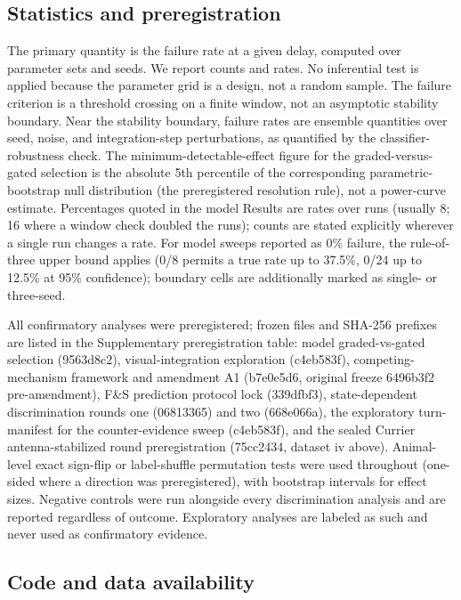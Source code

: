 \documentclass[pdflatex,sn-nature]{sn-jnl}
\begin{document}
\subsection{Statistics and preregistration}

The primary quantity is the failure rate at a given delay, computed over parameter sets and seeds. We report counts and rates. No inferential test is applied because the parameter grid is a design, not a random sample. The failure criterion is a threshold crossing on a finite window, not an asymptotic stability boundary. Near the stability boundary, failure rates are ensemble quantities over seed, noise, and integration-step perturbations, as quantified by the classifier-robustness check. The minimum-detectable-effect figure for the graded-versus-gated selection is the absolute 5th percentile of the corresponding parametric-bootstrap null distribution (the preregistered resolution rule), not a power-curve estimate. Percentages quoted in the model Results are rates over runs (usually 8; 16 where a window check doubled the runs); counts are stated explicitly wherever a single run changes a rate. For model sweeps reported as 0\% failure, the rule-of-three upper bound applies (0/8 permits a true rate up to 37.5\%, 0/24 up to 12.5\% at 95\% confidence); boundary cells are additionally marked as single- or three-seed.

All confirmatory analyses were preregistered; frozen files and SHA-256 prefixes are listed in the Supplementary preregistration table: model graded-vs-gated selection (9563d8c2), visual-integration exploration (c4eb583f), competing-mechanism framework and amendment A1 (b7e0e5d6, original freeze 6496b3f2 pre-amendment), F\&S prediction protocol lock (339dfbf3), state-dependent discrimination rounds one (06813365) and two (668e066a), the exploratory turn-manifest for the counter-evidence sweep (c4eb583f), and the sealed Currier antenna-stabilized round preregistration (75cc2434, dataset iv above). Animal-level exact sign-flip or label-shuffle permutation tests were used throughout (one-sided where a direction was preregistered), with bootstrap intervals for effect sizes. Negative controls were run alongside every discrimination analysis and are reported regardless of outcome. Exploratory analyses are labeled as such and never used as confirmatory evidence.

\subsection{Code and data availability}
\end{document}
